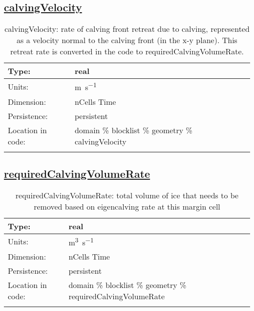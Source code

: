 \subsection[calvingVelocity]{\hyperref[sec:var_tab_geometry]{calvingVelocity}}
\label{subsec:var_sec_geometry_calvingVelocity}
\begin{center}
\begin{longtable}{| p{2.0in} | p{4.0in} |}
        \hline 
        Type: & real \\
        \hline 
        Units: & \si{m.s^{-1}} \\
        \hline 
        Dimension: & nCells Time \\
        \hline 
        Persistence: & persistent \\
        \hline 
         Location in code: & domain \% blocklist \% geometry \% calvingVelocity \\
         \hline 
    \caption{calvingVelocity: rate of calving front retreat due to calving, represented as a velocity normal to the calving front (in the x-y plane).  This retreat rate is converted in the code to requiredCalvingVolumeRate.}
\end{longtable}
\end{center}
\subsection[requiredCalvingVolumeRate]{\hyperref[sec:var_tab_geometry]{requiredCalvingVolumeRate}}
\label{subsec:var_sec_geometry_requiredCalvingVolumeRate}
\begin{center}
\begin{longtable}{| p{2.0in} | p{4.0in} |}
        \hline 
        Type: & real \\
        \hline 
        Units: & \si{m^3.s^{-1}} \\
        \hline 
        Dimension: & nCells Time \\
        \hline 
        Persistence: & persistent \\
        \hline 
         Location in code: & domain \% blocklist \% geometry \% requiredCalvingVolumeRate \\
         \hline 
    \caption{requiredCalvingVolumeRate: total volume of ice that needs to be removed based on eigencalving rate at this margin cell}
\end{longtable}
\end{center}
